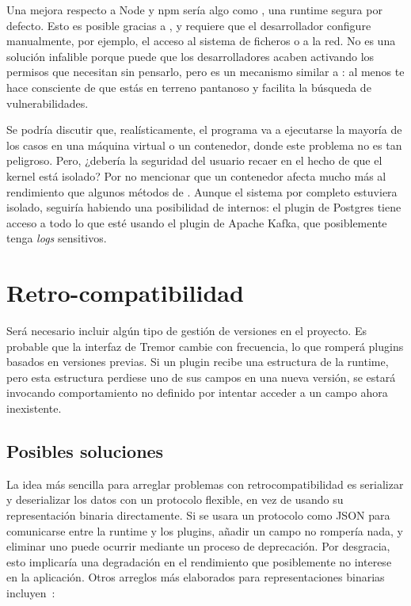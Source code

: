 Una mejora respecto a Node y npm sería algo como , una runtime
segura por defecto. Esto es posible gracias a \sandboxing, y requiere que el
desarrollador configure manualmente, por ejemplo, el acceso al sistema de
ficheros o a la red. No es una solución infalible porque puede que los
desarrolladores acaben activando los permisos que necesitan sin pensarlo, pero
es un mecanismo similar a \unsafe: al menos te hace consciente de que estás en
terreno pantanoso y facilita la búsqueda de vulnerabilidades.

Se podría discutir que, realísticamente, el programa va a ejecutarse la mayoría
de los casos en una máquina virtual o un contenedor, donde este problema no es
tan peligroso. Pero, ¿debería la seguridad del usuario recaer en el hecho de que
el kernel está isolado? Por no mencionar que un contenedor afecta mucho más al
rendimiento que algunos métodos de \sandboxing. Aunque el sistema por completo
estuviera isolado, seguiría habiendo una posibilidad de \leaks internos: el
plugin de Postgres tiene acceso a todo lo que esté usando el plugin de Apache
Kafka, que posiblemente tenga \emph{logs} sensitivos.

\section{Retro-compatibilidad}\label{sec:compat}

Será necesario incluir algún tipo de gestión de versiones en el proyecto. Es
probable que la interfaz de Tremor cambie con frecuencia, lo que romperá plugins
basados en versiones previas. Si un plugin recibe una estructura de la runtime,
pero esta estructura perdiese uno de sus campos en una nueva versión, se estará
invocando comportamiento no definido por intentar acceder a un campo ahora
inexistente.

\subsection{Posibles soluciones}

La idea más sencilla para arreglar problemas con retrocompatibilidad es
serializar y deserializar los datos con un protocolo flexible, en vez de usando
su representación binaria directamente. Si se usara un protocolo como JSON para
comunicarse entre la runtime y los plugins, añadir un campo no rompería nada, y
eliminar uno puede ocurrir mediante un proceso de deprecación. Por desgracia,
esto implicaría una degradación en el rendimiento que posiblemente no interese
en la aplicación. Otros arreglos más elaborados para representaciones binarias
incluyen~\cite{swiftabi}:

